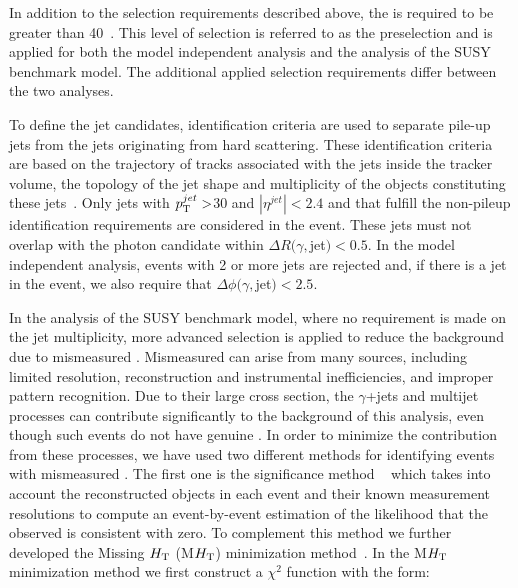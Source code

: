        In addition to the selection requirements described above, the \met is required to be greater than 40~\GeV. This level of selection is referred to as the preselection and is applied for both the model independent analysis and the analysis of the SUSY benchmark model. The additional applied selection requirements differ between the two analyses.
  
        To define the jet candidates, identification criteria are used to separate pile-up jets from the jets originating from hard scattering. These identification criteria are based on the trajectory of tracks associated with the jets inside the tracker volume, the topology of the jet shape and multiplicity of the objects constituting these jets~\cite{CMS-PAS-JME-13-005}. Only jets with $p_{\mathrm{T}}^{jet} > $30 \GeV and $|\eta^{jet}| < 2.4$ and that fulfill the non-pileup identification requirements are considered in the event. These jets must not overlap with the photon candidate within $\Delta R(\gamma,$jet$) < 0.5$. In the model independent analysis, events with 2 or more jets are rejected and, if there is a jet in the event, we also require that $\Delta \phi(\gamma,$jet$) < 2.5$. 

	    In the analysis of the SUSY benchmark model, where no requirement is made on the jet multiplicity, more advanced selection is applied to reduce the background due to mismeasured \met. Mismeasured \met can arise from many sources, including limited \met resolution, reconstruction and instrumental inefficiencies, and improper pattern recognition. Due to their large cross section, the $\gamma$+jets and multijet processes can contribute significantly to the background of this analysis, even though such events do not have genuine \met. In order to minimize the contribution from these processes, we have used two different methods for identifying events with mismeasured \met. The first one is  the \met significance method ~\cite{Chatrchyan:2011tn} which takes into account the reconstructed objects in each event and their known measurement resolutions to compute an event-by-event estimation of the likelihood that the observed \met is consistent with zero. To complement this method we further developed the Missing $H_{\mathrm{T}}$ (M$H_{\mathrm{T}}$) minimization method~\cite{CMS:2014mea}. In the M$H_{\mathrm{T}}$ minimization method we first construct a $\chi^2$ function with the form:
 
